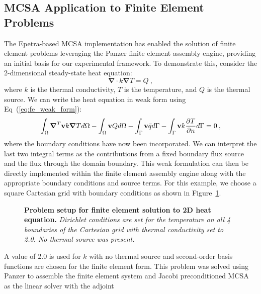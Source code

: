 \subsection{MCSA Application to Finite Element Problems}
\label{subsec:mcsa_finite_element}
The Epetra-based MCSA implementation has enabled the solution of
finite element problems leveraging the Panzer finite element assembly
engine, providing an initial basis for our experimental framework. To
demonstrate this, consider the 2-dimensional steady-state heat
equation:
\begin{equation}
  \boldsymbol{\nabla} \cdot k \boldsymbol{\nabla} T = Q\:,
  \label{eq:heat_equation}
\end{equation}
where $k$ is the thermal conductivity, $T$ is the temperature, and $Q$
is the thermal source. We can write the heat equation in weak form
using Eq~(\ref{eq:fe_weak_form}):
\begin{equation}
  \int_{\Omega} \boldsymbol{\nabla}^T \mathbf{v} k \boldsymbol{\nabla} T
  d\Omega - \int_{\Omega} \mathbf{v}Q d\Omega - \int_{\Gamma} \mathbf{v}
  \bar{q} d\Gamma - \int_{\Gamma} \mathbf{v} k \frac{\partial T}{\partial
    n} d\Gamma= 0\:,
  \label{eq:weak_heat_equation}
\end{equation}
where the boundary conditions have now been incorporated. We can
interpret the last two integral terms as the contributions from a
fixed boundary flux source and the flux through the domain
boundary. This weak formulation can then be directly implemented
within the finite element assembly engine along with the appropriate
boundary conditions and source terms. For this example, we choose a
square Cartesian grid with boundary conditions as shown in
Figure~\ref{fig:heat_eq_setup}.  
\begin{figure}[htpb!]
  \begin{center}
    \scalebox{1.5}{
       }
  \end{center}
  \caption{\textbf{Problem setup for finite element solution to 2D
      heat equation.} \textit{Dirichlet conditions are set for the
      temperature on all 4 boundaries of the Cartesian grid with
      thermal conductivity set to 2.0. No thermal source was
      present.}}
  \label{fig:heat_eq_setup}
\end{figure}
A value of 2.0 is used for $k$ with no thermal source and second-order
basis functions are chosen for the finite element form. This problem
was solved using Panzer to assemble the finite element system and
Jacobi preconditioned MCSA as the linear solver with the adjoint
